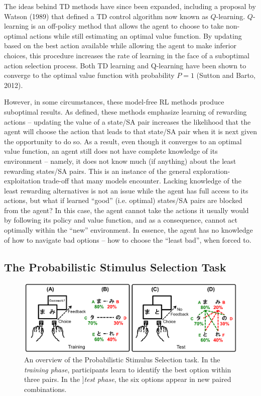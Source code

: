 \documentclass[10pt,letterpaper]{article}
\begin{document}
The ideas behind TD methods have since been expanded, including a proposal by Watson (1989) that defined a TD control algorithm now known as $Q$-learning. $Q$-learning is an off-policy method that allows the agent to choose to take non-optimal actions while still estimating an optimal value function. By updating based on the best action available while allowing the agent to make inferior choices, this procedure increases the rate of learning in the face of a suboptimal action selection process. Both TD learning and Q-learning have been shown to converge to the optimal value function with probability $P = 1$ (Sutton and Barto, 2012).

However, in some circumstances, these model-free RL methods produce suboptimal results. As defined, these methods emphasize learning of rewarding actions – updating the value of a state/SA pair increases the likelihood that the agent will choose the action that leads to that state/SA pair when it is next given the opportunity to do so. As a result, even though it converges to an optimal value function, an agent still does not have complete knowledge of its environment – namely, it does not know much (if anything) about the least rewarding states/SA pairs. This is an instance of the general exploration-exploitation trade-off that many models encounter. Lacking knowledge of the least rewarding alternatives is not an issue while the agent has full access to its actions, but what if learned ``good'' (i.e. optimal) states/SA pairs are blocked from the agent? In this case, the agent cannot take the actions it usually would by following its policy and value function, and as a consequence, cannot act optimally within the ``new'' environment. In essence, the agent has no knowledge of how to navigate bad options – how to choose the ``least bad'', when forced to.

\subsection{The Probabilistic Stimulus Selection Task}

\begin{figure}[ht]
	\begin{center}
		\includegraphics[width=\textwidth]{pss.png}
	\end{center}
	\caption{An overview of the Probabilistic Stimulus Selection task. In the \emph{training phase}, participants learn to identify the best option within three pairs. In the ]\emph{test phase}, the six options appear in new paired combinations.}
	\label{pss}
\end{figure}
\end{document}
